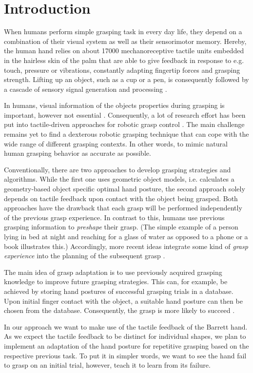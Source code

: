 \renewcommand{\thesection}{\Roman{section}}
\thispagestyle{empty}
\section{Introduction}
\quad When humans perform simple grasping task in every day life, they depend on a combination of their visual system as well as their sensorimotor memory. Hereby, the human hand relies on about 17000 mechanoreceptive tactile units \cite{SkinTouch} embedded in the hairless skin of the palm that are able to give feedback in response to e.g. touch, pressure or vibrations, constantly adapting fingertip forces and grasping strength. Lifting up an object, such as a cup or a pen, is consequently followed by a cascade of sensory signal generation and processing \cite{TortaGerardJ.2011}. 

In humans, visual information of the objects properties during grasping is important, however not essential  \cite{VisualSensory}. Consequently, a lot of research effort has been put into tactile-driven approaches for robotic grasp control \cite{LeeNicholls} \cite{Yousef1}. The main challenge remains yet to find a dexterous robotic grasping technique that can cope with the wide range of different grasping contexts. In other words, to mimic natural human grasping behavior as accurate as possible. 

Conventionally, there are two approaches to develop grasping strategies and algorithms. While the first one uses geometric object models, i.e. calculates a geometry-based object specific optimal hand posture, the second approach solely depends on tactile feedback upon contact with the object being grasped. Both approaches have the drawback that each grasp will be performed independently of the previous grasp experience. In contrast to this, humans use previous grasping information to \emph{preshape} their grasp. (The simple example of a person lying in bed at night and reaching for a glass of water as opposed to a phone or a book illustrates this.) Accordingly, more recent ideas integrate some kind of \emph{grasp experience} into the planning of the subsequent grasp \cite{Steffen}\cite{Pastor}. 

The main idea of grasp adaptation is to use previously acquired grasping knowledge to improve future grasping strategies. This can, for example, be achieved by storing hand postures of successful grasping trials in a database. Upon initial finger contact with the object, a suitable hand posture can then be chosen from the database. Consequently, the grasp is more likely to succeed \cite{Steffen}.

In our approach we want to make use of the tactile feedback of the Barrett hand. As we expect the tactile feedback to be distinct for individual shapes, we plan to implement an adaptation of the hand posture for repetitive grasping based on the respective previous task. To put it in simpler words, we want to see the hand fail to grasp on an initial trial, however, teach it to learn from its failure.

